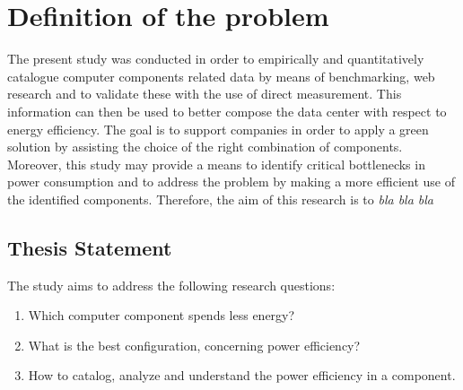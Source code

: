 


\section{Definition of the problem} \label{sec1:problem}
    
    The present study was conducted in order to empirically and quantitatively catalogue computer components related data by means of benchmarking, web research and to validate these with the use of direct measurement. This information can then be used to better compose the data center with respect to energy efficiency. The goal is to support companies in order to apply a green solution by assisting the choice of the right combination of components.
    Moreover, this study may provide a means to identify critical bottlenecks in power consumption and to address the problem by making a more efficient use of the identified components. Therefore, the aim of this research is to \emph{bla bla bla}%
    
    \subsection{Thesis Statement}\label{sec1:thesis_statement}
        The study aims to address the following research questions:
        \begin{enumerate}
	        \item Which computer component spends less energy?
	        \item What is the best configuration, concerning power efficiency?
	        \item How to catalog, analyze and understand the power efficiency in a component.
        \end{enumerate}


